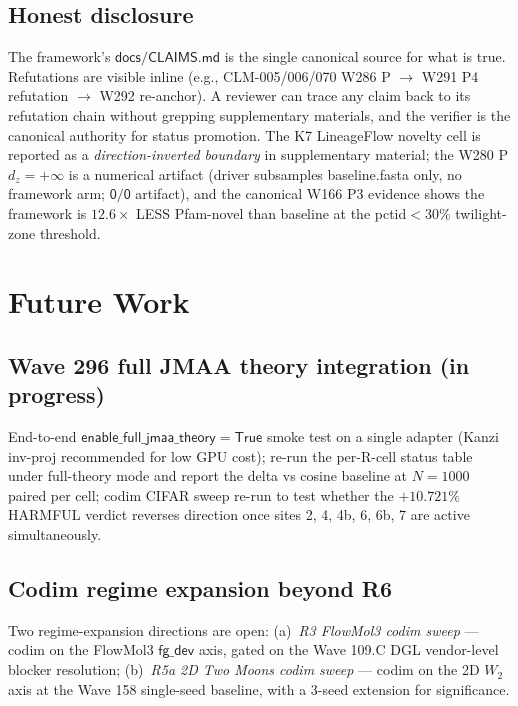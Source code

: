 \documentclass[journal,twocolumn,final]{IEEEtran}
\newcommand{\dz}{d_z}
\newcommand{\wftwo}{W_2}
\begin{document}
\subsection*{Honest disclosure}

The framework's $\mathsf{docs/CLAIMS.md}$ is the single canonical source for
what is true. Refutations are visible inline (e.g., CLM-005/006/070 W286 P
$\to$ W291 P4 refutation $\to$ W292 re-anchor). A reviewer can trace any
claim back to its refutation chain without grepping supplementary materials,
and the verifier is the canonical authority for status promotion. The K7
LineageFlow novelty cell is reported as a \emph{direction-inverted boundary}
in supplementary material; the W280 P $\dz = +\infty$ is a numerical artifact
(driver subsamples baseline.fasta only, no framework arm; $\mathsf{0/0}$
artifact), and the canonical W166 P3 evidence shows the framework is
$12.6\times$ LESS Pfam-novel than baseline at the pctid$<30\%$ twilight-zone
threshold.

\section{Future Work}\label{sec:futurework}

\subsection*{Wave 296 full JMAA theory integration (in progress)}

End-to-end $\mathsf{enable\_full\_jmaa\_theory}=\mathsf{True}$ smoke test on a
single adapter (Kanzi inv-proj recommended for low GPU cost); re-run the
per-R-cell status table under full-theory mode and report the delta vs cosine
baseline at $N = 1000$ paired per cell; codim CIFAR sweep re-run to test
whether the $+10.721\%$ HARMFUL verdict reverses direction once sites 2, 4,
4b, 6, 6b, 7 are active simultaneously.

\subsection*{Codim regime expansion beyond R6}

Two regime-expansion directions are open: (a)~\emph{R3 FlowMol3 codim sweep}
--- codim on the FlowMol3 $\mathsf{fg\_dev}$ axis, gated on the Wave 109.C DGL
vendor-level blocker resolution; (b)~\emph{R5a 2D Two Moons codim sweep} ---
codim on the 2D $\wftwo$ axis at the Wave 158 single-seed baseline, with a
3-seed extension for significance.
\end{document}
